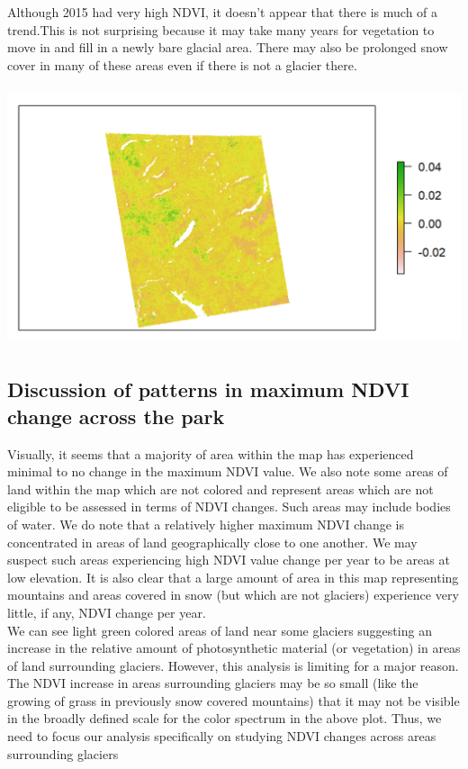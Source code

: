 \documentclass[11pt]{article}
\begin{document}
Although 2015 had very high NDVI, it doesn’t appear that there is much of a trend.This is not surprising because it may take many years for vegetation to move in and fill in a newly bare glacial area. There may also be prolonged snow cover in many of these areas even if there is not a glacier there. \\

\begin{center}
\includegraphics[height=3in]{q7.png}
\end{center}

\subsection*{Discussion of patterns in maximum NDVI change across the park}

Visually, it seems that a majority of area within the map has experienced minimal to no change
in the maximum NDVI value. We also note some areas of land within the map which are not
colored and represent areas which are not eligible to be assessed in terms of NDVI changes.
Such areas may include bodies of water. We do note that a relatively higher maximum NDVI
change is concentrated in areas of land geographically close to one another. We may suspect
such areas experiencing high NDVI value change per year to be areas at low elevation. It is also
clear that a large amount of area in this map representing mountains and areas covered in snow
(but which are not glaciers) experience very little, if any, NDVI change per year.\\

We can see light green colored areas of land near some glaciers suggesting an increase in the
relative amount of photosynthetic material (or vegetation) in areas of land surrounding glaciers.
However, this analysis is limiting for a major reason. The NDVI increase in areas surrounding
glaciers may be so small (like the growing of grass in previously snow covered mountains) that it
may not be visible in the broadly defined scale for the color spectrum in the above plot. Thus,
we need to focus our analysis specifically on studying NDVI changes across areas surrounding
glaciers\\
\end{document}

